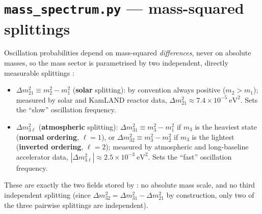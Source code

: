 \section{\texttt{mass\_spectrum.py} --- mass-squared splittings}


\begin{theorybox}
Oscillation probabilities depend on mass-squared \emph{differences}, never
on absolute masses, so the mass sector is parametrised by two independent,
directly measurable splittings \parencite{ParticleDataGroup}:
\begin{itemize}
  \item $\Delta m^2_{21}\equiv m_2^2-m_1^2$ (\textbf{solar} splitting): by
    convention always positive ($m_2>m_1$); measured by solar and KamLAND
    reactor data, $\Delta m^2_{21}\approx7.4\times10^{-5}\ \mathrm{eV^2}$.
    Sets the ``slow'' oscillation frequency.
  \item $\Delta m^2_{3\ell}$ (\textbf{atmospheric} splitting):
    $\Delta m^2_{31}\equiv m_3^2-m_1^2$ if $m_3$ is the heaviest state
    (\textbf{normal ordering}, $\ell=1$), or
    $\Delta m^2_{32}\equiv m_3^2-m_2^2$ if $m_3$ is the lightest
    (\textbf{inverted ordering}, $\ell=2$); measured by atmospheric and
    long-baseline accelerator data,
    $|\Delta m^2_{3\ell}|\approx2.5\times10^{-3}\ \mathrm{eV^2}$. Sets the
    ``fast'' oscillation frequency.
\end{itemize}
These are exactly the two fields stored by : no
absolute mass scale, and no third independent splitting (since
$\Delta m^2_{32}=\Delta m^2_{31}-\Delta m^2_{21}$ by construction, only two
of the three pairwise splittings are independent).
\end{theorybox}

